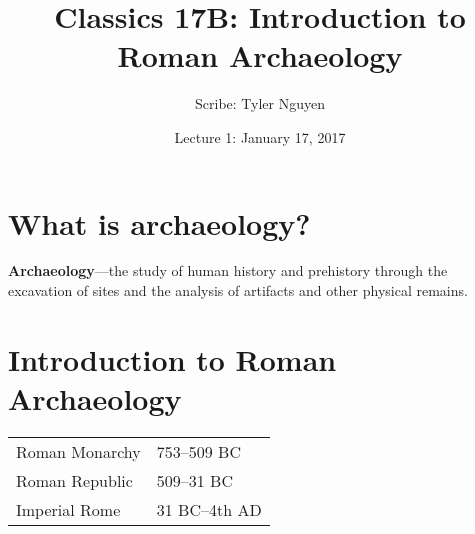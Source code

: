 \documentclass{article}
\begin{document}
\title{Classics 17B: Introduction to Roman Archaeology}
\author{Scribe: Tyler Nguyen}
\date{Lecture 1: January 17, 2017}
\maketitle
\section{What is archaeology?}
\textbf{Archaeology}---the study of human history and prehistory through the excavation of sites and the analysis of artifacts and other physical remains.
\section{Introduction to Roman Archaeology}
\begin{tabular}{ll}
Roman Monarchy & 753--509 BC\\
Roman Republic & 509--31 BC\\
Imperial Rome & 31 BC--4th AD\\
\end{tabular}
\end{document}
